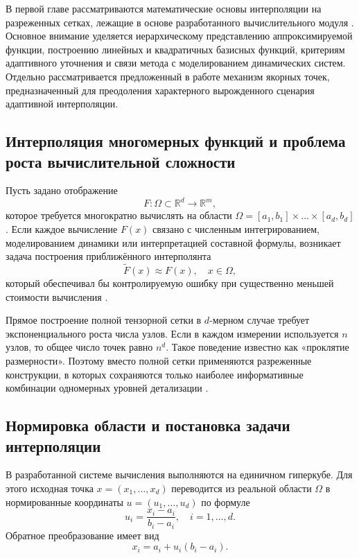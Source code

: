 В первой главе рассматриваются математические основы интерполяции на разреженных сетках, лежащие в основе разработанного вычислительного модуля \cite{Bungartz2004,Zenger1991}. Основное внимание уделяется иерархическому представлению аппроксимируемой функции, построению линейных и квадратичных базисных функций, критериям адаптивного уточнения и связи метода с моделированием динамических систем. Отдельно рассматривается предложенный в работе механизм якорных точек, предназначенный для преодоления характерного вырожденного сценария адаптивной интерполяции.

\subsection{Интерполяция многомерных функций и проблема роста вычислительной сложности}

Пусть задано отображение
\begin{equation}
    F \colon \Omega \subset \mathbb{R}^d \to \mathbb{R}^m,
\end{equation}
которое требуется многократно вычислять на области $\Omega = [a_1, b_1] \times \dots \times [a_d, b_d]$. Если каждое вычисление $F(x)$ связано с численным интегрированием, моделированием динамики или интерпретацией составной формулы, возникает задача построения приближённого интерполянта
\begin{equation}
    \widetilde{F}(x) \approx F(x), \quad x \in \Omega,
\end{equation}
который обеспечивал бы контролируемую ошибку при существенно меньшей стоимости вычисления \cite{Quarteroni2007,Stoer2002}.

Прямое построение полной тензорной сетки в $d$-мерном случае требует экспоненциального роста числа узлов. Если в каждом измерении используется $n$ узлов, то общее число точек равно $n^d$. Такое поведение известно как «проклятие размерности». Поэтому вместо полной сетки применяются разреженные конструкции, в которых сохраняются только наиболее информативные комбинации одномерных уровней детализации \cite{Bungartz2004,Zenger1991}.

\subsection{Нормировка области и постановка задачи интерполяции}

В разработанной системе вычисления выполняются на единичном гиперкубе. Для этого исходная точка $x = (x_1, \dots, x_d)$ переводится из реальной области $\Omega$ в нормированные координаты $u = (u_1, \dots, u_d)$ по формуле
\begin{equation}
    u_i = \frac{x_i - a_i}{b_i - a_i}, \quad i = 1, \dots, d.
\end{equation}
Обратное преобразование имеет вид
\begin{equation}
    x_i = a_i + u_i (b_i - a_i).
\end{equation}

